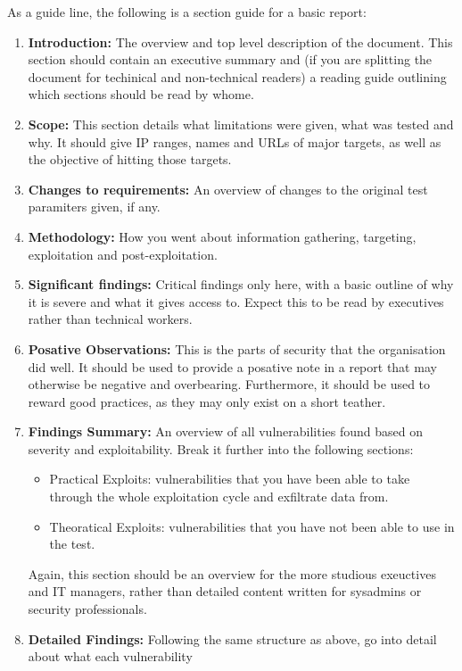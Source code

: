 		As a guide line, the following is a section guide for a basic report:
		\begin{enumerate}
			\item \textbf{Introduction:} The overview and top level description of the document. 
				This section should contain an executive summary and 
				(if you are splitting the document for techinical and non-technical readers)
				a reading guide outlining which sections should be read by whome. 
			\item \textbf{Scope:} This section details what limitations were given, what was tested and why. 
				It should give IP ranges, names and URLs of major targets, as well as the objective of hitting those targets. 
			\item \textbf{Changes to requirements:} An overview of changes to the original test paramiters given, if any. 
			\item \textbf{Methodology:} How you went about information gathering, targeting, exploitation and post-exploitation. 
			\item \textbf{Significant findings:} Critical findings only here, with a basic outline of why it is severe 
				and what it gives access to. 
				Expect this to be read by executives rather than technical workers. 
			\item \textbf{Posative Observations:} This is the parts of security that the organisation did well. 
				It should be used to provide a posative note in a report that may otherwise be negative and overbearing. 
				Furthermore, it should be used to reward good practices, as they may only exist on a short teather. 
			\item \textbf{Findings Summary:} An overview of all vulnerabilities found based on severity and exploitability. 
				Break it further into the following sections:
				\begin{itemize}
					\item Practical Exploits: vulnerabilities that you have been able to take through the whole exploitation cycle and exfiltrate data from. 
					\item Theoratical Exploits: vulnerabilities that you have not been able to use in the test. 
				\end{itemize}
				Again, this section should be an overview for the more studious exeuctives and IT managers, rather than detailed content written for sysadmins or security professionals. 
			\item \textbf{Detailed Findings:} Following the same structure as above, go into detail about what each vulnerability

\end{enumerate}
